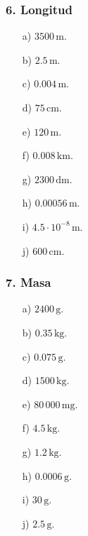\subsubsection*{6. Longitud}
\begin{enumerate}
    \item[a)] $3500\,\mathrm{m}$.
    \item[b)] $2.5\,\mathrm{m}$.
    \item[c)] $0.004\,\mathrm{m}$.
    \item[d)] $75\,\mathrm{cm}$.
    \item[e)] $120\,\mathrm{m}$.
    \item[f)] $0.008\,\mathrm{km}$.
    \item[g)] $2300\,\mathrm{dm}$.
    \item[h)] $0.00056\,\mathrm{m}$.
    \item[i)] $4.5\cdot10^{-8}\,\mathrm{m}$.
    \item[j)] $600\,\mathrm{cm}$.
\end{enumerate}

\subsubsection*{7. Masa}
\begin{enumerate}
    \item[a)] $2400\,\mathrm{g}$.
    \item[b)] $0.35\,\mathrm{kg}$.
    \item[c)] $0.075\,\mathrm{g}$.
    \item[d)] $1500\,\mathrm{kg}$.
    \item[e)] $80\,000\,\mathrm{mg}$.
    \item[f)] $4.5\,\mathrm{kg}$.
    \item[g)] $1.2\,\mathrm{kg}$.
    \item[h)] $0.0006\,\mathrm{g}$.
    \item[i)] $30\,\mathrm{g}$.
    \item[j)] $2.5\,\mathrm{g}$.
\end{enumerate}

